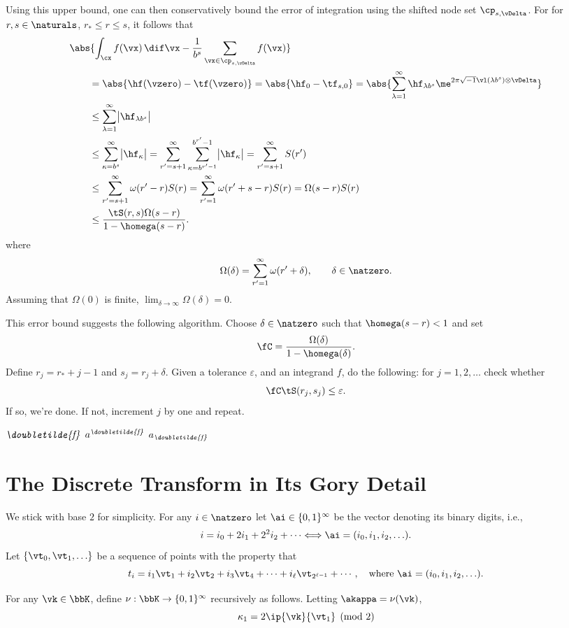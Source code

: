 \documentclass[]{elsarticle}
\newcommand{\fudge}{\fC}
\newcommand{\dtf}{\textit{\doubletilde{f}}}
\theoremstyle{definition}
\begin{document}
Using this upper bound, one can then conservatively bound the error of integration using the shifted node set $\cp_{s,\vDelta}$.  For for $r, s \in \naturals$, $r_* \le r \le s$, it follows that 
\begin{align*}
\MoveEqLeft{\abs{\int_{\cx} f(\vx) \, \dif \vx - \frac{1}{b^s} \sum_{\vx \in \cp_{s,\vDelta}} f(\vx) }}\\
&= \abs{\hf(\vzero) - \tf(\vzero)} = \abs{\hf_0 - \tf_{s,0}} = \abs{\sum_{\lambda=1}^{\infty} \hf_{\lambda b^{s}} \me^{2 \pi \sqrt{-1} \vl(\lambda b^{s}) \otimes \vDelta}}\\
&\le \sum_{\lambda=1}^{\infty} \bigl \lvert \hf_{\lambda b^{s}} \bigr \rvert \\
&\le \sum_{\kappa=b^{s}}^{\infty} \bigl \lvert \hf_{\kappa} \bigr \rvert = \sum_{r'=s+1}^{\infty} \sum_{\kappa=b^{r'-1}}^{b^{r'}-1} \bigl \lvert \hf_{\kappa} \bigr \rvert = \sum_{r'=s+1}^{\infty} S(r')\\
&\le \sum_{r'=s+1}^{\infty} \omega(r'-r) S(r) =   \sum_{r'=1}^{\infty} \omega(r'+s-r) S(r) =  \Omega(s-r) S(r)\\
& \le \frac{\tS(r,s)\Omega(s-r)}{1 - \homega(s-r)}.
\end{align*}
where 
\[
\Omega(\delta)=\sum_{r'=1}^{\infty} \omega(r'+ \delta), \qquad \delta \in \natzero.
\]
Assuming that $\Omega(0)$ is finite, $\lim_{\delta \to \infty} \Omega(\delta) = 0$.

This error bound suggests the following algorithm.  Choose $\delta \in \natzero$ such that $\homega(s-r)<1$ and set 
\[
\fudge = \frac{\Omega(\delta)}{1 - \homega(\delta)}.
\]
Define $r_j=r_*+j-1$ and $s_j=r_j+\delta$.  Given a tolerance $\varepsilon$, and an integrand $f$, do the following:  for $j=1, 2, \ldots$ check whether
\[
\fudge \tS(r_j,s_j) \le \varepsilon.
\]
If so, we're done.  If not, increment $j$ by one and repeat.


$\dtf$ $a^{\dtf}$ $a_{\dtf}$

\section{The Discrete Transform in Its Gory Detail}

We stick with base $2$ for simplicity.  For any $i\in \natzero$ let $\ai \in \{0,1\}^\infty$ be the vector denoting its binary digits, i.e., 
\[
i=i_0+2i_1+2^2i_2+ \cdots \Longleftrightarrow \ai=(i_0,i_1,i_2, \ldots ).
\]
Let $\{\vt_0, \vt_1, \ldots\}$ be a sequence of points with the property that 
\[
t_i= i_1 \vt_1 +i_2 \vt_2 + i_3 \vt_4 + \cdots + i_\ell \vt_{2^{\ell-1}} + \cdots, \quad \text{where } \ai=(i_0,i_1,i_2, \ldots ).
\]

For any $\vk \in \bbK$, define $\nu: \bbK \to  \{0,1\}^\infty$ recursively as follows. Letting $\akappa=\nu(\vk)$, 
\[
\kappa_1 = 2\ip{\vk}{\vt_1} \pmod 2
\]  




\end{document}
